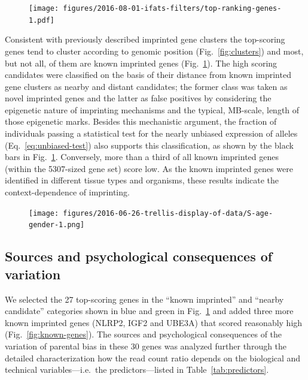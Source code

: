 \documentclass[letterpaper]{article}
\begin{document}
\begin{figure}
\begin{center}
\texttt{[image: figures/2016-08-01-ifats-filters/top-ranking-genes-1.pdf]}
\caption{}
\label{fig:top-genes}
\end{center}
\end{figure}

Consistent with previously described imprinted gene clusters the top-scoring
genes tend to cluster according to genomic position (Fig.~\ref{fig:clusters})
and most, but not all, of them are known imprinted genes
(Fig.~\ref{fig:top-genes}).  The high scoring candidates were classified on
the basis of their distance from known imprinted gene clusters as nearby and
distant candidates; the former class was taken as novel imprinted genes and
the latter as false positives by considering the epigenetic nature of
imprinting mechanisms and the typical, MB-scale, length of those epigenetic
marks.  Besides this mechanistic argument, the fraction of individuals passing
a statistical test for the nearly unbiased expression of alleles
(Eq.~\ref{eq:unbiased-test}) also supports this classification, as shown by
the black bars in Fig.~\ref{fig:top-genes}. Conversely, more than a third of
all known imprinted genes (within the 5307-sized gene set) score low.  As the
known imprinted genes were identified in different tissue types and organisms,
these results indicate the context-dependence of imprinting.

\begin{figure}
\begin{center}
\texttt{[image: figures/2016-06-26-trellis-display-of-data/S-age-gender-1.png]}
\caption{}
\label{fig:S-age-gender}
\end{center}
\end{figure}

\subsection{Sources and psychological consequences of variation}
\label{sec:models-regression}

We selected the 27 top-scoring genes in the ``known imprinted'' and ``nearby
candidate'' categories shown in blue and green in Fig.~\ref{fig:top-genes} and
added three more known imprinted genes (NLRP2, IGF2 and UBE3A) that scored
reasonably high (Fig.~\ref{fig:known-genes}).  The sources and psychological
consequences of the variation of parental bias in these 30 genes was analyzed
further through the detailed characterization how the read count ratio depends
on the biological and technical variables---i.e.~the predictors---listed in Table~\ref{tab:predictors}.
\end{document}
